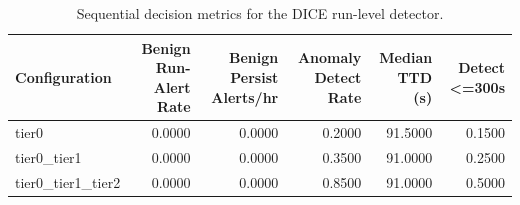 \begin{table}[t]
\centering
\caption{Sequential decision metrics for the DICE run-level detector.}
\label{tab:dice_sequential_metrics}
\footnotesize
\begin{tabular}{lrrrrr}
\toprule
Configuration & Benign Run-Alert Rate & Benign Persist Alerts/hr & Anomaly Detect Rate & Median TTD (s) & Detect <=300s \\
\midrule
tier0 & 0.0000 & 0.0000 & 0.2000 & 91.5000 & 0.1500 \\
tier0_tier1 & 0.0000 & 0.0000 & 0.3500 & 91.0000 & 0.2500 \\
tier0_tier1_tier2 & 0.0000 & 0.0000 & 0.8500 & 91.0000 & 0.5000 \\
\bottomrule
\end{tabular}

\end{table}
